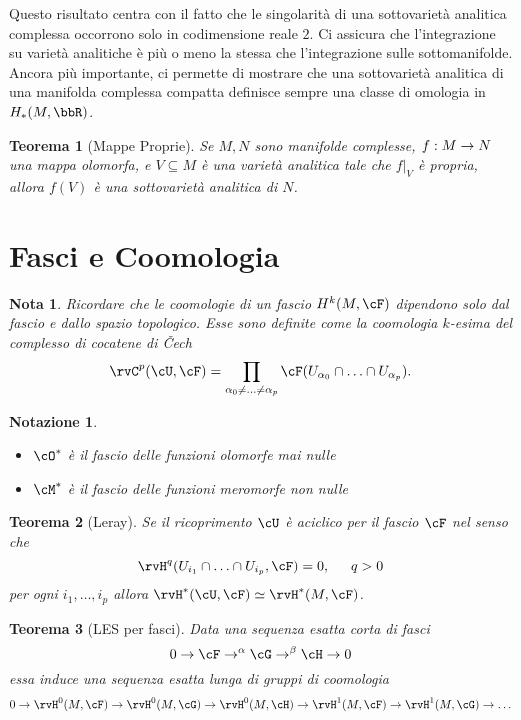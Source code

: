\documentclass[a4paper,11pt]{article}
\newtheorem{teorema}{Teorema}
\newtheorem{nota}{Nota}
\newtheorem{notazione}{Notazione}
\begin{document}
Questo risultato centra con il fatto che le singolarità di una sottovarietà analitica complessa occorrono solo in codimensione reale $2$.
Ci assicura che l'integrazione su varietà analitiche è più o meno la stessa che l'integrazione sulle sottomanifolde.
Ancora più importante, ci permette di mostrare che una sottovarietà analitica di una manifolda complessa compatta definisce sempre una classe di omologia in $H_* (M, \bbR)$.

\begin{teorema}[Mappe Proprie]
  Se $M, N$ sono manifolde complesse, $f: M \rightarrow N$ una mappa olomorfa, e $V \subseteq M$ è una varietà analitica tale che $f|_V$ è propria, allora $f(V)$ è una sottovarietà analitica di $N$.
\end{teorema}

\section{Fasci e Coomologia}

\begin{nota}
  Ricordare che le coomologie di un fascio $H^k(M, \cF)$ dipendono solo dal fascio e dallo spazio topologico.
  Esse sono definite come la coomologia $k$-esima del complesso di cocatene di Čech
  $$ \rvC^p (\cU, \cF) = \prod_{\alpha_0 \neq \ldots \neq \alpha_p} \cF(U_{\alpha_0} \cap \ldots \cap U_{\alpha_p}). $$
\end{nota}

\begin{notazione}
  \begin{itemize}
  \item $\cO^*$ è il fascio delle funzioni olomorfe {\emph mai nulle}
  \item $\cM^*$ è il fascio delle funzioni meromorfe {\emph non nulle}
  \end{itemize}
\end{notazione}

\begin{teorema}[Leray]
  Se il ricoprimento $\cU$ è aciclico per il fascio $\cF$ nel senso che
  $$ \rvH^q (U_{i_1} \cap \ldots \cap U_{i_p}, \cF) = 0, \hskip 1.5em q > 0 $$
  per ogni $i_1, \ldots, i_p$ allora $\rvH^*(\cU, \cF) \simeq \rvH^*(M, \cF)$.
\end{teorema}

\begin{teorema}[LES per fasci]
  Data una sequenza esatta corta di fasci
  $$ 0 \rar \cF \rar^\alpha \cG \rar^\beta \cH \rar 0 $$
  essa induce una sequenza esatta lunga di gruppi di coomologia
  $$ 0 \rar \rvH^0(M, \cF) \rar \rvH^0(M, \cG) \rar \rvH^0(M, \cH) \rar \rvH^1(M, \cF) \rar \rvH^1(M, \cG) \rar \ldots $$
\end{teorema}
\end{document}

